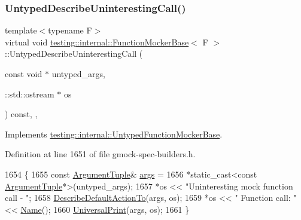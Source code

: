 \subsubsection{\texorpdfstring{Untyped\+Describe\+Uninteresting\+Call()}{UntypedDescribeUninterestingCall()}}
{\footnotesize\ttfamily template$<$typename F$>$ \\
virtual void \hyperlink{classtesting_1_1internal_1_1FunctionMockerBase}{testing\+::internal\+::\+Function\+Mocker\+Base}$<$ F $>$\+::Untyped\+Describe\+Uninteresting\+Call (\begin{DoxyParamCaption}\item[{const void $\ast$}]{untyped\+\_\+args,  }\item[{\+::std\+::ostream $\ast$}]{os }\end{DoxyParamCaption}) const\hspace{0.3cm}{\ttfamily [inline]}, {\ttfamily [private]}, {\ttfamily [virtual]}}



Implements \hyperlink{classtesting_1_1internal_1_1UntypedFunctionMockerBase_a48a17fa75b744c2bfb19ee1f54d51759}{testing\+::internal\+::\+Untyped\+Function\+Mocker\+Base}.



Definition at line 1651 of file gmock-\/spec-\/builders.\+h.


\begin{DoxyCode}
1654                                               \{
1655     \textcolor{keyword}{const} \hyperlink{classtesting_1_1internal_1_1FunctionMockerBase_a336432a07e544af4ffb8103603471ca3}{ArgumentTuple}& \hyperlink{namespacegenerate__debs_a75f9143e38df82d83b2e8a6f99cae02c}{args} =
1656         *\textcolor{keyword}{static\_cast<}\textcolor{keyword}{const }\hyperlink{classtesting_1_1internal_1_1FunctionMockerBase_a336432a07e544af4ffb8103603471ca3}{ArgumentTuple}*\textcolor{keyword}{>}(untyped\_args);
1657     *os << \textcolor{stringliteral}{"Uninteresting mock function call - "};
1658     \hyperlink{classtesting_1_1internal_1_1FunctionMockerBase_ac9f58631036d0507047e0088b829c237}{DescribeDefaultActionTo}(args, os);
1659     *os << \textcolor{stringliteral}{"    Function call: "} << \hyperlink{classtesting_1_1internal_1_1UntypedFunctionMockerBase_ae90a5b5d48db1e99634bc6ff39ded335}{Name}();
1660     \hyperlink{namespacetesting_1_1internal_a30708fa2bacf11895b03bdb21eb72309}{UniversalPrint}(args, os);
1661   \}
\end{DoxyCode}
\mbox{\label{classtesting_1_1internal_1_1FunctionMockerBase_aa200995eb89574f8042ba6897d6cb98f}} 
